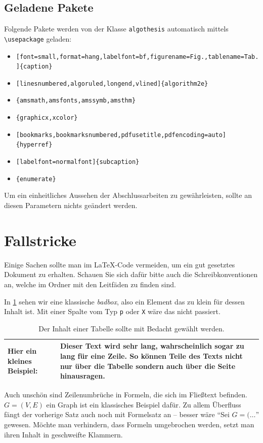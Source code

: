 \documentclass[bachelor,german]{algothesis}
\begin{document}
\subsection{Geladene Pakete}
Folgende Pakete werden von der Klasse \verb+algothesis+ automatisch mittels \verb+\usepackage+ geladen:
\begin{itemize}
 \item \verb+[font=small,format=hang,labelfont=bf,figurename=Fig.,tablename=Tab.]{caption}+
 \item \verb+[linesnumbered,algoruled,longend,vlined]{algorithm2e}+
 \item \verb+{amsmath,amsfonts,amssymb,amsthm}+
 \item \verb+{graphicx,xcolor}+
 \item \verb+[bookmarks,bookmarksnumbered,pdfusetitle,pdfencoding=auto]{hyperref}+
 \item \verb+[labelfont=normalfont]{subcaption}+
 \item \verb+{enumerate}+
\end{itemize}

Um ein einheitliches Aussehen der Abschlussarbeiten zu gewährleisten, sollte an diesen Parametern nichts geändert werden.


\section{Fallstricke}
\label{sec:notes}
Einige Sachen sollte man im \LaTeX{}-Code vermeiden, um ein gut gesetztes Dokument zu erhalten. 
Schauen Sie sich dafür bitte auch die Schreibkonventionen an, welche im Ordner mit den Leitfäden zu finden sind.

In \cref{tab:badbox} sehen wir eine klassische \emph{badbox}, also ein Element das zu klein für dessen Inhalt ist.
Mit einer Spalte vom Typ \verb+p+ oder \verb+X+ wäre das nicht passiert.

\begin{table}[h]
 \caption{Der Inhalt einer Tabelle sollte mit Bedacht gewählt werden.}
 \label{tab:badbox}
 \begin{tabular}{ll}
 \hline
  Hier ein kleines Beispiel: &
  Dieser Text wird sehr lang, wahrscheinlich sogar zu lang für eine Zeile. So können Teile des Texts nicht nur über die Tabelle sondern auch über die Seite hinausragen.\\
  \hline
 \end{tabular}
\end{table}

Auch unschön sind Zeilenumbrüche in Formeln, die sich im Fließtext befinden. 
$G=(V,E)$ ein Graph ist ein klassisches Beispiel dafür.
Zu allem Überfluss fängt der vorherige Satz auch noch mit Formelsatz an -- besser wäre ``Sei $G=(\dots$'' gewesen.
Möchte man verhindern, dass Formeln umgebrochen werden, setzt man ihren Inhalt in geschweifte Klammern.
\end{document}
